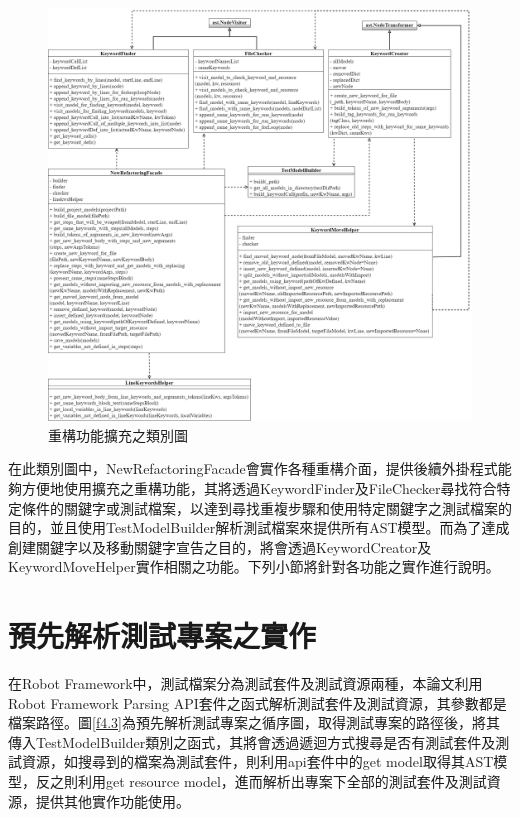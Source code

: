\begin{figure}[H]
	\centering
    \includegraphics[width=1.0\textwidth]{picture/ch4/Feature_class.png}
    \caption{重構功能擴充之類別圖}
    \label{f4.2}
\end{figure}

\indent
在此類別圖中，NewRefactoringFacade會實作各種重構介面，提供後續外掛程式能夠方便地使用擴充之重構功能，其將透過KeywordFinder及FileChecker尋找符合特定條件的關鍵字或測試檔案，以達到尋找重複步驟和使用特定關鍵字之測試檔案的目的，並且使用TestModelBuilder解析測試檔案來提供所有AST模型。而為了達成創建關鍵字以及移動關鍵字宣告之目的，將會透過KeywordCreator及KeywordMoveHelper實作相關之功能。下列小節將針對各功能之實作進行說明。

\section{預先解析測試專案之實作}
\indent
在Robot Framework中，測試檔案分為測試套件及測試資源兩種，本論文利用Robot Framework Parsing API套件之函式解析測試套件及測試資源，其參數都是檔案路徑。圖\ref{f4.3}為預先解析測試專案之循序圖，取得測試專案的路徑後，將其傳入TestModelBuilder類別之函式，其將會透過遞迴方式搜尋是否有測試套件及測試資源，如搜尋到的檔案為測試套件，則利用api套件中的get model取得其AST模型，反之則利用get resource model，進而解析出專案下全部的測試套件及測試資源，提供其他實作功能使用。

